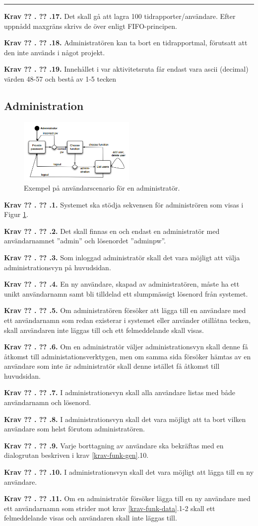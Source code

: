 \documentclass[a4paper]{article}
\newcommand\getcurrentref[1]{%
 \ifnumequal{\value{#1}}{0}
  {??}
  {\the\value{#1}}%
}
\newcommand\requirement[2]{
	\numberedrow{Krav}{#1}{#2}
}
\newcommand\numberedrow[3]{
	\noindent
	\textbf{#1 \getcurrentref{section}.\getcurrentref{subsection}.#2.} #3
	
}
\begin{document}
\noindent\rule{8cm}{0.4pt}  %

\requirement{17}{Det skall gå att lagra 100 tidrapporter/användare. Efter uppnådd maxgräns skrivs de över enligt FIFO-principen.}
\requirement{18}{Administratören kan ta bort en tidrapportmal, förutsatt att den inte används i något projekt.}
\requirement{19}{Innehållet i var aktivitetsruta får endast vara ascii (decimal) värden 48-57 och bestå av 1-5 tecken}


\subsection{Administration}
\label{krav-funk-admin}

\begin{figure}[h!]
  \centering
    \includegraphics[width=0.5\textwidth]{admin_usage}
   \caption{Exempel på användarscenario för en administratör.}
   \label{image_admin_usage}
\end{figure}
\requirement{1}{Systemet ska stödja sekvensen för administrören som visas i Figur \ref{image_admin_usage}.}
\requirement{2}{Det skall finnas en och endast en administratör med användarnamnet ''admin'' och lösenordet ''adminpw''.}
\requirement{3}{Som inloggad administratör skall det vara möjligt att välja administrationsvyn på huvudsidan.}
\requirement{4}{En ny användare, skapad av administratören, måste ha ett unikt användarnamn samt bli tilldelad ett slumpmässigt lösenord från systemet.}
\requirement{5}{Om administratören försöker att lägga till en användare med ett användarnamn som redan existerar i systemet eller använder otillåtna tecken, skall användaren inte läggas till och ett felmeddelande skall visas.}
\requirement{6}{Om en administratör väljer administrationsvyn skall denne få åtkomst till administationsverktygen, men om samma sida försöker hämtas av en användare som inte är administratör skall denne istället få åtkomst till huvudsidan.}
\requirement{7}{I administrationsvyn skall alla användare listas med både användarnamn och lösenord.}
\requirement{8}{I administrationsvyn skall det vara möjligt att ta bort vilken användare som helst förutom administratören.}
\requirement{9}{Varje borttagning av användare ska bekräftas med en dialogrutan beskriven i krav \ref{krav-funk-gen}.10.}
\requirement{10}{I administrationsvyn skall det vara möjligt att lägga till en ny användare.}
\requirement{11}{Om en administratör försöker lägga till en ny användare med ett användarnamn som strider mot krav \ref{krav-funk-data}.1-2 skall ett felmeddelande visas och användaren skall inte läggas till.}
\end{document}
